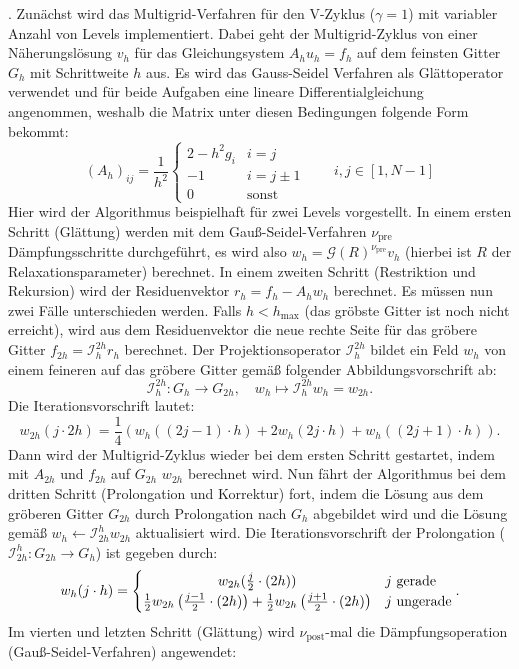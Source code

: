 \documentclass[11pt,a4paper]{article}
\begin{document}
. Zunächst wird das Multigrid-Verfahren für den V-Zyklus ($\gamma = 1$) mit variabler Anzahl von Levels implementiert. Dabei geht der Multigrid-Zyklus von einer Näherungslösung $v_h$ für das Gleichungsystem $A_h u_h = f_h$ auf dem
feinsten Gitter $G_h$ mit Schrittweite $h$ aus. Es wird das Gauss-Seidel Verfahren als Glättoperator verwendet und für beide Aufgaben eine lineare Differentialgleichung
angenommen, weshalb die Matrix unter diesen Bedingungen folgende Form bekommt:
\[(A_h)_{ij} = \frac{1}{h^2}
\begin{cases}
2 - h^2g_i & i = j\\
-1 & i = j\pm 1\\
0 & \text{sonst}
\end{cases} \qquad i,j\in[1,N-1]\]
Hier wird der Algorithmus beispielhaft für zwei Levels vorgestellt. In einem ersten Schritt (Glättung) werden mit dem Gauß-Seidel-Verfahren $\nu_{\mathrm{pre}}$ Dämpfungsschritte durchgeführt, es wird also $w_h = \mathcal{G}(R)^{\nu_{\mathrm{pre}}} v_h$ (hierbei ist $R$ der Relaxationsparameter) berechnet.
In einem zweiten Schritt (Restriktion und Rekursion) wird der Residuenvektor $r_h = f_h - A_h w_h$ berechnet. 
Es müssen nun zwei Fälle unterschieden werden. Falls $h<h_{\mathrm{max}}$ (das gröbste Gitter ist noch nicht erreicht), wird aus dem Residuenvektor die neue rechte Seite für das gröbere
Gitter $f_{2h} = \mathcal{I}_h^{2h} r_h$ berechnet. Der Projektionsoperator $\mathcal{I}_h^{2h}$ bildet ein Feld $w_h$ von einem feineren auf das gröbere Gitter gemäß folgender Abbildungsvorschrift ab:
\begin{equation*}
    \mathcal{I}_h^{2h} : G_h \rightarrow G_{2h} , \quad w_h \mapsto \mathcal{I}_h^{2h} w_h = w_{2h} .
\end{equation*} Die Iterationsvorschrift lautet:
\begin{equation*}
    w_{2h}(j \cdot 2h) = \frac{1}{4} (w_h((2j - 1) \cdot h) + 2 w_h(2j \cdot h) + w_h((2j + 1) \cdot h)) .
\end{equation*}
Dann wird der Multigrid-Zyklus wieder bei dem ersten Schritt gestartet, indem mit $A_{2h}$ und $f_{2h}$ auf $G_{2h}$ $w_{2h}$ berechnet wird. Nun fährt der Algorithmus bei dem dritten Schritt (Prolongation und Korrektur) fort, indem die Lösung aus dem
gröberen Gitter $G_{2h}$ durch Prolongation nach $G_h$ abgebildet wird und die Lösung gemäß $w_h \leftarrow \mathcal{I}_{2h}^h w_{2h}$ aktualisiert wird. Die Iterationsvorschrift der Prolongation ($\mathcal{I}_{2h}^h : G_{2h} \rightarrow G_h$) ist gegeben durch:
\begin{equation*}
    w_h(j \cdot h) = 
    \begin{cases}
        \hfil w_{2h}(\frac{j}{2} \cdot (2h)) & j \ \mathrm{gerade} \\
        \frac{1}{2} w_{2h} \left(\frac{j-1}{2} \cdot (2h)\right) + \frac{1}{2} w_{2h} \left(\frac{j+1}{2} \cdot (2h)\right) & j \ \mathrm{ungerade}    
    \end{cases} .
\end{equation*} Im vierten und letzten Schritt (Glättung) wird $\nu_{\mathrm{post}}$-mal die Dämpfungsoperation (Gauß-Seidel-Verfahren) angewendet:
\end{document}
